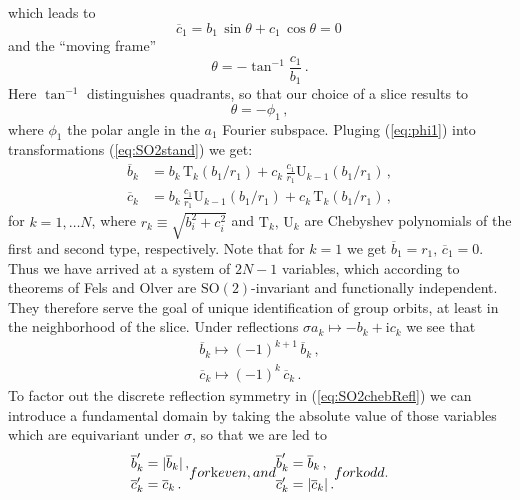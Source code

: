 \documentclass[aip,cha,showpacs,twocolumn,
 		  reprint]{revtex4-1} %
\newcommand{\beq}{\begin{equation}}
\newcommand{\eeq}{\end{equation}}
\newcommand{\bseq}{\begin{subequations}}
\newcommand{\eseq}{\end{subequations}}
\newcommand{\rf}     [1] {\cite{#1}}
\newcommand{\refeq}  [1] {(\ref{#1})}
\newcommand{\SOn}[1]{\ensuremath{\textrm{SO}(#1)}}         %
\newcommand{\Refl}{\ensuremath{\sigma}}
\newcommand{\chebT}{\mathrm{T}}
\newcommand{\chebU}{\mathrm{U}}
\newcommand{\ii}{\ensuremath{\mathrm{i}}} %
\begin{document}
which leads to
\beq
	\overline{c}_1 = b_1\,\sin\theta + c_1\,\cos\theta  = 0\,
	\label{eq:SO2norm}
\eeq
and the ``moving frame''
\beq
	\theta=-\tan^{-1}\frac{c_1}{b_1}\,.
	\label{eq:SO2mf}
\eeq
Here $\tan^{-1}$ distinguishes quadrants, so that our choice of a slice
results to
\beq\label{eq:phi1}
  \theta=-\phi_1\,,
\eeq
where $\phi_1$ the polar angle in the $a_1$ Fourier
subspace. Pluging \refeq{eq:phi1} into
transformations \refeq{eq:SO2stand} we get:
\bseq\label{eq:SO2cheb}
  \begin{align}
    \overline{b}_k &=
		    b_k\, \chebT_k\left(b_1/r_1\right)+
		    c_k\,\frac{c_1}{r_1} \chebU_{k-1}\left(b_1/r_1\right)\,, \label{eq:SO2cheb1}\\
    \overline{c}_k &=
		    b_k\, \frac{c_1}{r_1} \chebU_{k-1}\left(b_1/r_1\right)+
		    c_k\,\chebT_k\left(b_1/r_1\right)\,,  \label{eq:SO2cheb2}
  \end{align}
\eseq
for $k=1,\ldots N$, where $r_k\equiv\sqrt{b_i^2+c_i^2}$ and $\chebT_k,\,\chebU_k$
are Chebyshev polynomials of the first and second type, respectively.
Note that for $k=1$ we get $\overline{b}_1=r_1,\, \overline{c}_1=0$.
Thus we have arrived at a system of $2N-1$ variables, which according to
theorems of Fels and Olver\rf{FelsOlver98,FelsOlver99} are
$\SOn{2}$-invariant and functionally independent. They therefore serve the goal
of unique identification of group orbits, at least in the neighborhood of the
slice. Under reflections $\Refl a_k \mapsto-b_k+\ii c_k$ we see that
\bseq\label{eq:SO2chebRefl}
 \begin{align}
  \overline{b}_k \mapsto (-1)^{k+1}\, \overline{b}_k\,,\\
  \overline{c}_k \mapsto (-1)^{k}\, \overline{c}_k\,.
 \end{align}
\eseq
 To factor out the discrete reflection symmetry in \refeq{eq:SO2chebRefl} we can
introduce a fundamental domain by taking the absolute value of those variables
which are equivariant under $\Refl$, so that we are led to
\bseq\label{eq:O2cheb}
  \begin{align}
    \overline{b}'_k &=
		    |\overline{b}_k|\,, \\
    \overline{c}'_k &=
		    \overline{c}_k\,.
  \end{align}
for $k$ even, and
  \begin{align}
    \overline{b}'_k &=
		    \overline{b}_k\,, \\
    \overline{c}'_k &=
		    |\overline{c}_k|\,.
  \end{align}
for $k$ odd.
\eseq
\end{document}
